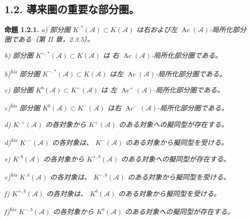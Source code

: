 \clearpage
{}%
\begingroup\small\setlength{\parskip}{0pt}\setlength{\emergencystretch}{1.5em}
\setlength{\abovedisplayskip}{4pt plus 2pt minus 2pt}%
\setlength{\belowdisplayskip}{4pt plus 2pt minus 2pt}%

\subsection*{1.2. 導来圏の重要な部分圏。}

\noindent\textbf{命題 1.2.1.}\quad
\textit{a) 部分圏 $K^{,*}(\mathcal A)\subset K(\mathcal A)$ は右および左
$\operatorname{Ac}(\mathcal A)$-局所化部分圏である（第 II 章，2.3.5）。}

\noindent\textit{b) 部分圏 $K^{+,*}(\mathcal A)\subset K(\mathcal A)$ は
右 $\operatorname{Ac}(\mathcal A)$-局所化部分圏である。}

\noindent\textit{b)\textsuperscript{bis} 部分圏
$K^{-,*}(\mathcal A)\subset K(\mathcal A)$ は左
$\operatorname{Ac}(\mathcal A)$-局所化部分圏である。}

\noindent\textit{c) 部分圏 $K^{b}(\mathcal A)\subset K^{+}(\mathcal A)$ は
左 $\operatorname{Ac}^{+}(\mathcal A)$-局所化部分圏である。}

\noindent\textit{c)\textsuperscript{bis} 部分圏
$K^{b}(\mathcal A)\subset K^{-}(\mathcal A)$ は右
$\operatorname{Ac}^{-}(\mathcal A)$-局所化部分圏である。}

\noindent\textit{d) $K^{,+}(\mathcal A)$ の各対象から
$K^{+}(\mathcal A)$ のある対象への擬同型が存在する。}

\noindent\textit{d)\textsuperscript{bis} $K^{,-}(\mathcal A)$ の各対象は、
$K^{-}(\mathcal A)$ のある対象から擬同型を受ける。}

\noindent\textit{e) $K^{,b}(\mathcal A)$ の各対象から
$K^{+,b}(\mathcal A)$ のある対象への擬同型が存在する。}

\noindent\textit{e)\textsuperscript{bis} $K^{,b}(\mathcal A)$ の各対象は、
$K^{-,b}(\mathcal A)$ のある対象から擬同型を受ける。}

\noindent\textit{f) $K^{+,b}(\mathcal A)$ の各対象は、
$K^{b}(\mathcal A)$ のある対象から擬同型を受ける。}

\noindent\textit{f)\textsuperscript{bis} $K^{-,b}(\mathcal A)$ の各対象から
$K^{b}(\mathcal A)$ のある対象への擬同型が存在する。}

